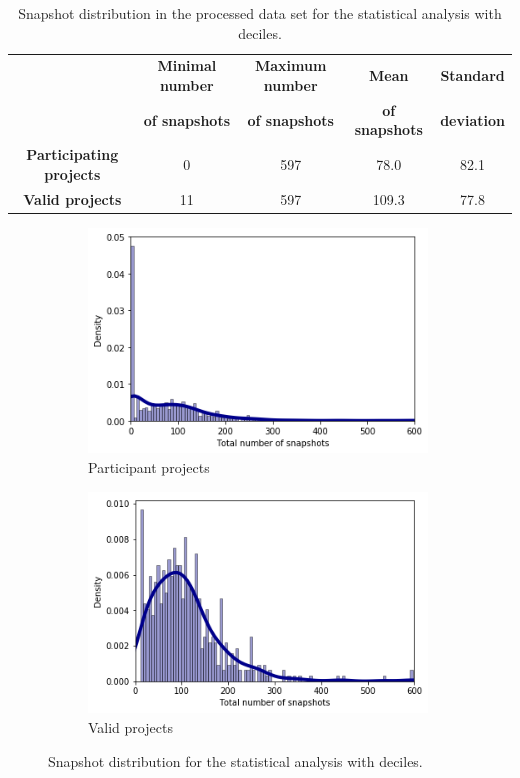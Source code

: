 \begin{table}
    \centering
    \begin{tabular}{|c|c|c|c|c|}
        \hline
        & \textbf{Minimal number} & \textbf{Maximum number} & \textbf{Mean} &\textbf{Standard} \\
        & \textbf{of snapshots} & \textbf{of snapshots} & \textbf{of snapshots} & \textbf{deviation} \\ \hline
        \textbf{Participating projects} & 0 & 597 & 78.0 & 82.1 \\ \hline
        \textbf{Valid projects} & 11 & 597 & 109.3 & 77.8 \\ \hline
    \end{tabular}
    \caption{Snapshot distribution in the processed data set for the statistical analysis with deciles.}
    \label{table:statistical_analysis_distribution_snapshots}
\end{table}

\begin{figure}
  \centering
  \begin{subfigure}{9cm}
    \includegraphics[width=9cm]{img/snapshots_participant_projects.png}
    \caption{Participant projects}
    \label{subfig:participant_projects}
  \end{subfigure}
  \begin{subfigure}{9cm}
    \includegraphics[width=9cm]{img/snapshots_valid_projects.png}
    \caption{Valid projects}
    \label{subfig:valid_projects}
  \end{subfigure}
  \caption{Snapshot distribution for the statistical analysis with deciles.}
  \label{fig:distribution_snapshots_deciles}
\end{figure} 


